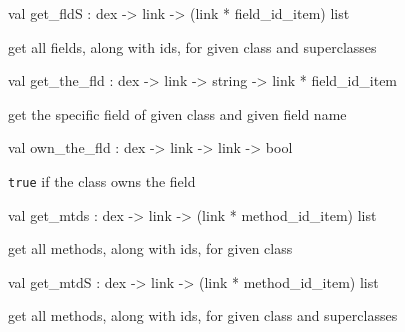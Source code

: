 \documentclass[11pt]{article}
\begin{document}
\label{val:Dex.get-underscorefldS}\begin{ocamldoccode}
val get_fldS : dex -> link -> (link * field_id_item) list
\end{ocamldoccode}
\begin{ocamldocdescription}
get all fields, along with ids, for given class and superclasses


\end{ocamldocdescription}




\label{val:Dex.get-underscorethe-underscorefld}\begin{ocamldoccode}
val get_the_fld : dex -> link -> string -> link * field_id_item
\end{ocamldoccode}
\begin{ocamldocdescription}
get the specific field of given class and given field name


\end{ocamldocdescription}




\label{val:Dex.own-underscorethe-underscorefld}\begin{ocamldoccode}
val own_the_fld : dex -> link -> link -> bool
\end{ocamldoccode}
\begin{ocamldocdescription}
{\tt{true}} if the class owns the field


\end{ocamldocdescription}




\label{val:Dex.get-underscoremtds}\begin{ocamldoccode}
val get_mtds : dex -> link -> (link * method_id_item) list
\end{ocamldoccode}
\begin{ocamldocdescription}
get all methods, along with ids, for given class


\end{ocamldocdescription}




\label{val:Dex.get-underscoremtdS}\begin{ocamldoccode}
val get_mtdS : dex -> link -> (link * method_id_item) list
\end{ocamldoccode}
\begin{ocamldocdescription}
get all methods, along with ids, for given class and superclasses


\end{ocamldocdescription}
\end{document}
